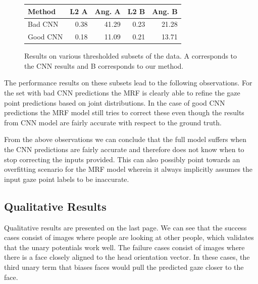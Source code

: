 \documentclass[10pt,twocolumn,letterpaper]{article}
\begin{document}
\begin{figure}[H]
  \begin{center}
    \begin{tabular}{|l|r|r|r|r|}
      \hline
      Method & L2 A & Ang. A & L2 B & Ang. B \\
      \hline
      Bad CNN & 0.38 & 41.29 & 0.23 & 21.28 \\
      Good CNN & 0.18 & 11.09 & 0.21 & 13.71 \\
      \hline
    \end{tabular}
  \end{center}
  \vspace{-0.3cm}
   \caption{Results on various thresholded subsets of the data. A corresponds to the CNN results and B corresponds to our method.}
  \vspace{-0.5cm}
\end{figure}

\vspace{3ex}
The performance results on these subsets lead to the following observations. For the set with bad CNN predictions the MRF is clearly able to refine the gaze point predictions based on joint distributions.  In the case of good CNN predictions the MRF model still tries to correct these even though the results from CNN model are fairly accurate with respect to the ground truth.

From the above observations we can conclude that the full model suffers when the CNN predictions are fairly accurate and therefore does not know when to stop correcting the inputs provided. This can also possibly point towards an overfitting scenario for the MRF model wherein it always implicitly assumes the input gaze point labels to be inaccurate.

\subsection{Qualitative Results}

Qualitative results are presented on the last page. We can see that the success cases consist of images where people are looking at other people, which validates that the unary potentials work well. The failure cases consist of images where there is a face closely aligned to the head orientation vector. In these cases, the third unary term that biases faces would pull the predicted gaze closer to the face.
\end{document}
